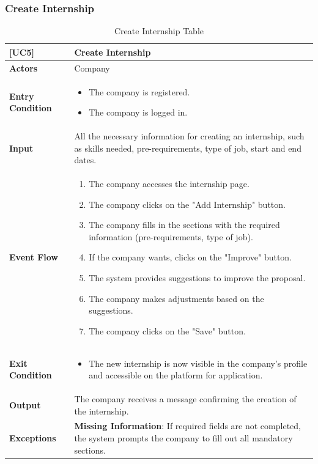 \subsubsection*{Create Internship}
\begin{table}[H]
    \centering
    \renewcommand{\arraystretch}{1.5}
    \begin{tabular}{|p{4cm}|p{11cm}|}
    \hline
    \rowcolor{bluepoli!40}
    \textbf{[UC5]} & \textbf{Create Internship} \\ \hline \hline
    \textbf{Actors} & Company \\ \hline
    \textbf{Entry Condition} & 
    {\setlength{\leftmargini}{1.1em}
    \begin{itemize}
        \item The company is registered.
        \item The company is logged in.
    \end{itemize}} \\ \hline
    \textbf{Input} & All the necessary information for creating an internship, such as skills needed, pre-requirements, type of job, start and end dates. \\ \hline
    \textbf{Event Flow} & 
    {\setlength{\leftmargini}{1.4em}
    \begin{enumerate}
        \item The company accesses the internship page.
        \item The company clicks on the "Add Internship" button.
        \item The company fills in the sections with the required information (pre-requirements, type of job).
        \item If the company wants, clicks on the "Improve" button.
        \item The system provides suggestions to improve the proposal.
        \item The company makes adjustments based on the suggestions.
        \item The company clicks on the "Save" button.
    \end{enumerate}} \\ \hline
    \textbf{Exit Condition} & 
    {\setlength{\leftmargini}{1.1em}
    \begin{itemize}
        \item The new internship is now visible in the company’s profile and accessible on the platform for application.
    \end{itemize}} \\ \hline
    \textbf{Output} & 
    The company receives a message confirming the creation of the internship. \\ \hline
    \textbf{Exceptions} & 
    \textbf{Missing Information}: If required fields are not completed, the system prompts the company to fill out all mandatory sections. \\ \hline
    \end{tabular}
    \caption{Create Internship Table}
\end{table}

